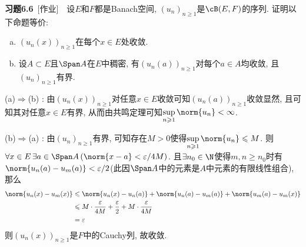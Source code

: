	\textbf{习题6.6}\ [作业]\ \ 设$ E $和$ F $都是Banach空间, $ (u_n)_{n\geqslant 1} $是$ \cB(E,F) $的序列. 证明以下命题等价:
	\begin{enumerate}[(a)]
	\item $ (u_n(x))_{n\geqslant 1} $在每个$ x\in E $处收敛.
	\item 设$ A\subset E $且$ \Span A $在$ E $中稠密, 有$ (u_n(a))_{n\geqslant 1} $对每个$ a\in A $均收敛, 且$ (u_n)_{n\geqslant 1} $有界.
	\end{enumerate}
	\begin{answer}
	(a)$ \Rightarrow $(b) : 由$ (u_n(x))_{n\geqslant 1} $对任意$ x\in E $收敛可知$ (u_n(a))_{n\geqslant 1} $收敛显然, 且可知其对任意$ x\in E $有界, 从而由共鸣定理可知$ \sup\limits_{n\geqslant 1}\norm{u_n}<\infty $.
	
	(b)$ \Rightarrow $(a) : 由$ (u_n)_{n\geqslant 1} $有界, 可知存在$ M>0 $使得$ \sup\limits_{n\geqslant 1}\norm{u_n}\leqslant M $. 则$ \forall x\in E\,\exists a\in\Span A\,(\norm{x-a}<\varepsilon/4M) $. 且$ \exists n_0\in\N $使得$ m,n\geqslant n_0 $时有$ \norm{u_n(a)-u_m(a)}<\varepsilon/2 $(此因$ \Span A $中的元素是$ A $中元素的有限线性组合), 那么
	\[
	\begin{aligned}
	\norm{u_n(x)-u_m(x)}&\leqslant\norm{u_n(x)-u_n(a)}+\norm{u_n(a)-u_m(a)}+\norm{u_m(a)-u_m(x)}\\
	&\leqslant M\cdot\frac{\varepsilon}{4M}+\frac{\varepsilon}{2}+M\cdot\frac{\varepsilon}{4M}\\
	&=\varepsilon
	\end{aligned}
	\]
	则$ (u_n(x))_{n\geqslant 1} $是$ F $中的Cauchy列, 故收敛.\qedhere
	\end{answer}


